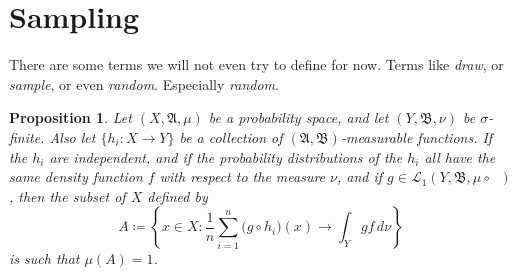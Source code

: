 \documentclass[
twoside=true,
paper=letter,
fontsize=9pt,
pagesize=auto,
leqno,
openany,
headsepline,
overfullrule,
]{scrbook}
\theoremstyle{plain}
\theoremstyle{plain}
\newtheorem{prop}[thm]{Proposition}
\theoremstyle{definition}
\theoremstyle{bfnoteitalic}
\theoremstyle{bfnoteroman}
\newcommand{\sigalg}[1]{\mathfrak{#1}}
\newcommand{\cali}[1]{\mathscr{#1}}
\newcommand{\definedby}{\coloneqq}
\newcommand{\textsigma}{\hbox{\large{$\sigma$}}\kern-1pt}
\newcommand{\preimage}[1]{\mathop{#1^{\leftarrow}}}
\newcommand{\sigmaalgebra}{\sigalg{A}}
\newcommand{\sigmaalgebraii}{\sigalg{B}}
\newcommand{\funcf}{f}
\newcommand{\funcg}{g}
\newcommand{\funch}{h}
\newcommand{\function}{f}
\newcommand{\functionii}{g}
\newcommand{\functioniii}{h}
\newcommand{\measurespace}{X}
\newcommand{\measurespaceii}{Y}
\newcommand{\mspaceelt}{x}
\newcommand{\measure}{\mu}
\newcommand{\measmu}{\mu}
\newcommand{\measnu}{\nu}
\newcommand{\seti}{A}
\begin{document}
\section{Sampling}
There are some terms we will not even try to define for now.
Terms like \emph{draw}, or \emph{sample}, or even \emph{random}. Especially \emph{random}.



\begin{prop}\label{sampling}
Let $(\measurespace,\sigmaalgebra,\measmu)$ be a probability space, and let 
$(\measurespaceii,\sigmaalgebraii,\measnu)$ be \textsigma-finite.
Also let
$\{ \funch_i:\measurespace\to\measurespaceii \}$ be a collection of 
$(\sigmaalgebra,\sigmaalgebraii)$\hyp{}measurable functions.
If the $\funch_i$ are independent, and if the probability distributions of the 
$\funch_i$ all have the same density function 
$\funcf$ 
with respect to the measure $\measnu$,
and if 
$\funcg\in
\cali{L}_1(\measurespaceii,\sigmaalgebraii,\measmu\circ\preimage{\funch_i})$,
then the subset of $\measurespace$ defined by
\[
\seti \definedby
\left\{ 
\mspaceelt\in\measurespace : 
\frac{1}{n} \sum_{i=1}^n \bigl( \functionii\circ \functioniii_i \bigr) (x) 
\to
\int_\measurespaceii \functionii \function \,d\measnu 
\right\}
\]
is such that  $\measure(\seti) = 1$.
\end{prop}
\end{document}
